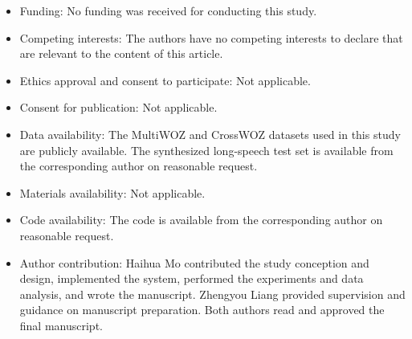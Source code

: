 \documentclass[pdflatex,iicol,Numbered,sn-basic]{sn-jnl}%
\begin{document}
\begin{itemize}
\item Funding: No funding was received for conducting this study.
\item Competing interests: The authors have no competing interests to declare that are relevant to the content of this article.
\item Ethics approval and consent to participate: Not applicable.
\item Consent for publication: Not applicable.
\item Data availability: The MultiWOZ and CrossWOZ datasets used in this study are publicly available. The synthesized long-speech test set is available from the corresponding author on reasonable request.
\item Materials availability: Not applicable.
\item Code availability: The code is available from the corresponding author on reasonable request.
\item Author contribution: Haihua Mo contributed the study conception and design, implemented the system, performed the experiments and data analysis, and wrote the manuscript. Zhengyou Liang provided supervision and guidance on manuscript preparation. Both authors read and approved the final manuscript.
\end{itemize}


\end{document}
